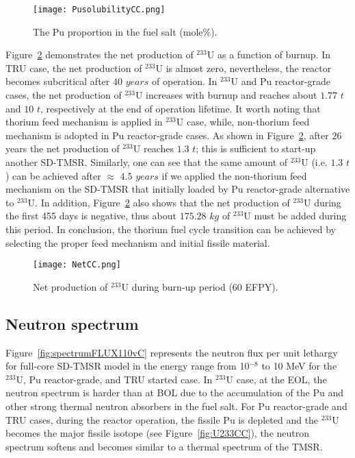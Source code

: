 \begin{figure}
	\centering
	\texttt{[image: PusolubilityCC.png]}
	\caption{The Pu proportion in the fuel salt (mole\%).}
	\label{fig:PusolubilityCC}
\end{figure}


Figure~\ref{fig:NetCC} demonstrates the net production of $^{233}$U as a function of burnup. In TRU case, the net production of $^{233}$U is almost zero, nevertheless, the reactor becomes subcritical after $40$ $years$ of operation. In $^{233}$U and Pu reactor-grade cases, the net production of $^{233}$U increases with burnup and reaches about $1.77$ $t$ and $10$ $t$, respectively at the end of operation lifetime. It worth noting that thorium feed mechanism is applied in $^{233}$U case, while, non-thorium feed mechanism is adopted in Pu reactor-grade cases.
As shown in Figure~\ref{fig:NetCC}, after 26 years the net production of $^{233}$U reaches $1.3$ $t$; this is sufficient to start-up another \gls{SD-TMSR}. Similarly, one can see that the same amount of $^{233}$U (i.e. $1.3$ $t$) can be achieved after $\approx$ $4.5$ $years$ if we applied the non-thorium feed mechanism on the SD-TMSR that initially loaded by Pu reactor-grade alternative to $^{233}$U. In addition, Figure~\ref{fig:NetCC} also shows that the net production of $^{233}$U during the first 455 days is negative, thus about $175.28$ $kg$ of $^{233}$U must be added during this period. In conclusion, the thorium fuel cycle transition can be achieved by selecting the proper feed mechanism and initial fissile material. 

\begin{figure}
	\centering
	\texttt{[image: NetCC.png]}
	\caption{Net production of $^{233}$U during burn-up period (60 \gls{EFPY}).}
	\label{fig:NetCC}
\end{figure}

\subsection{Neutron spectrum}

Figure~\ref{fig:spectrumFLUX110vC} represents the neutron flux per unit lethargy for full-core SD-TMSR model in the energy range from 10$^{-8}$ to 10 MeV for the $^{233}$U, Pu reactor-grade, and TRU started case. In $^{233}$U case, at the EOL, the neutron spectrum is harder than at BOL due to the accumulation of the Pu and other strong thermal neutron absorbers in the fuel salt. For Pu reactor-grade and TRU cases, during the reactor operation, the fissile Pu is depleted and the $^{233}$U becomes the major fissile isotope (see Figure~\ref{fig:U233CC}), the neutron spectrum softens and becomes similar to a thermal spectrum of the TMSR.
 
